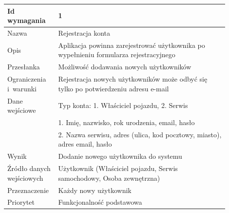 \documentclass[12pt]{article}
\begin{document}
\begin{table}[H]
\begin{center}
	\begin{tabular}{|p{0.18\linewidth}|p{0.72\linewidth}|}%
	\hline
	Id wymagania 	& 1 				\\ \hline
	Nazwa			& Rejestracja konta \\ \hline
	Opis & Aplikacja powinna zarejestrować użytkownika po wypełnieniu
formularza rejestracyjnego\\ \hline
	Przesłanka & Możliwość dodawania nowych użytkowników  \\ \hline
	Ograniczenia i~warunki & Rejestracja nowych użytkowników może odbyć się tylko po potwierdzeniu adresu e-mail  \\ \hline
	Dane wejściowe & Typ konta: 1. Właściciel pojazdu, 2. Serwis \\
	&  1. Imię, nazwisko, rok urodzenia, email, hasło \\
	& 2. Nazwa serwisu, adres (ulica, kod pocztowy, miasto), adres email, hasło  \\ \hline
	Wynik & Dodanie nowego użytkownika do systemu \\ \hline
	Źródło danych wejściowych & Użytkownik (Właściciel pojazdu, Serwis samochodowy, Osoba zewnętrzna) \\ \hline
	Przeznaczenie & Każdy nowy użytkownik \\ \hline
	Priorytet & Funkcjonalność podstawowa \\ \hline
	\end{tabular}

\end{center}
\end{table}
\end{document}
